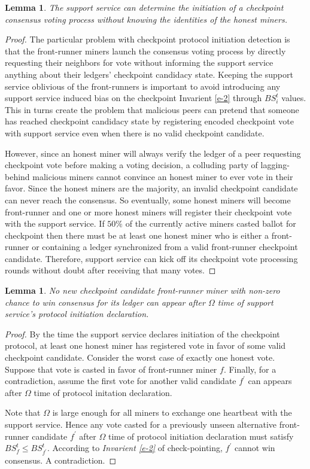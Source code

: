 \documentclass[conference]{IEEEtran}
\newtheorem{lemma}[theorem]{Lemma}
\begin{document}
\begin{lemma}
\label{l-proto-init}
The support service can determine the initiation of a checkpoint consensus voting process without knowing the identities of the honest miners.  
\end{lemma}
\begin{proof}
The particular problem with checkpoint protocol initiation detection is that the front-runner miners launch the consensus voting process by directly requesting their neighbors for vote without informing the support service anything about their ledgers' checkpoint candidacy state. Keeping the support service oblivious of the front-runners is important to avoid introducing any support service induced bias on the checkpoint Invarient \ref{e-2} through $BS_i^t$ values. This in turns create the problem that malicious peers can pretend that someone has reached checkpoint candidacy state by registering encoded checkpoint vote with support service even when there is no valid checkpoint candidate.

However, since an honest miner will always verify the ledger of a peer requesting checkpoint vote before making a voting decision, a colluding party of lagging-behind malicious miners cannot convince an honest miner to ever vote in their favor. Since the honest miners are the majority, an invalid checkpoint candidate can never reach the consensus. So eventually, some honest miners will become front-runner and one or more honest miners will register their checkpoint vote with the support service. If $50\%$ of the currently active miners casted ballot for checkpoint then there must be at least one honest miner who is either a front-runner or containing a ledger synchronized from a valid front-runner checkpoint candidate. Therefore, support service can kick off its checkpoint vote processing rounds without doubt after receiving that many votes. 
\end{proof}

\begin{lemma}
\label{l-cand-list}
No new checkpoint candidate front-runner miner with non-zero chance to win consensus for its ledger can appear after $\Omega$ time of support service's protocol initiation declaration.     
\end{lemma}
\begin{proof}
By the time the support service declares initiation of the checkpoint protocol, at least one honest miner has registered vote in favor of some valid checkpoint candidate. Consider the worst case of exactly one honest vote. Suppose that vote is casted in favor of front-runner miner $f$. Finally, for a contradiction, assume the first vote for another valid candidate $f^\prime$ can appears after $\Omega$ time of protocol initation declaration. 

Note that $\Omega$ is large enough for all miners to exchange one heartbeat with the support service. Hence any vote casted for a previously unseen alternative front-runner candidate $f^\prime$ after $\Omega$ time of protocol initiation declaration must satisfy $BS_f^t \leq BS_{f^\prime}^t$. According to \textit{Invarient \ref{e-2}} of check-pointing, $f^\prime$ cannot win consensus. A contradiction.  
\end{proof}
\end{document}
